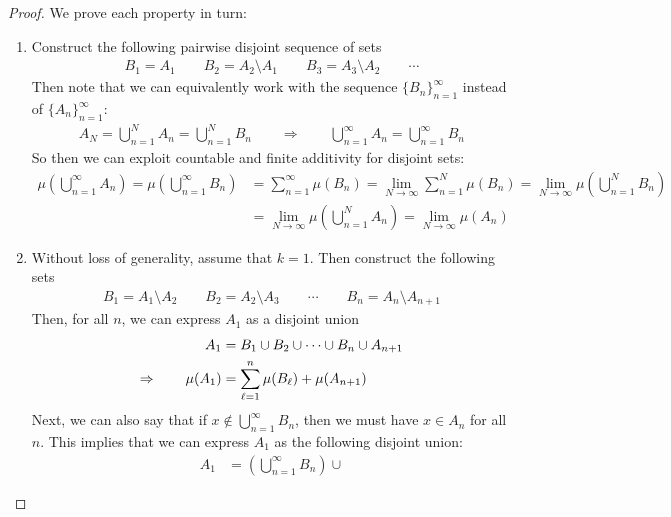 \documentclass[12pt]{article}
\theoremstyle{plain}
\theoremstyle{definition}
\theoremstyle{remark}
\newcommand{\ninf}{_{n=1}^\infty}
\begin{document}
\begin{proof}
We prove each property in turn:
\begin{enumerate}
  \item
    Construct the following pairwise disjoint sequence of sets
    \begin{align*}
        B_1 = A_1 \qquad B_2 = A_2 \setminus A_1
        \qquad B_3 = A_3 \setminus A_2 \qquad \cdots
    \end{align*}
    Then note that we can equivalently work with the sequence
    $\{B_n\}\ninf$ instead of $\{A_n\}\ninf$:
    \begin{align*}
        A_N = \bigcup^N_{n=1} A_n =
        \bigcup^N_{n=1} B_n
        \qquad \Rightarrow \qquad
        \bigcup^\infty_{n=1} A_n =
        \bigcup^\infty_{n=1} B_n
    \end{align*}
    So then we can exploit countable and finite additivity for disjoint
    sets:
    \begin{align*}
        \mu\left(\bigcup^\infty_{n=1} A_n \right)
        = \mu\left(\bigcup^\infty_{n=1} B_n \right)
        &= \sum^\infty_{n=1} \mu(B_n)
            = \lim_{N\rightarrow\infty}\sum^N_{n=1} \mu(B_n)
        = \lim_{N\rightarrow\infty}
            \mu\left(\bigcup^N_{n=1} B_n\right) \\
        &= \lim_{N\rightarrow\infty}
            \mu\left(\bigcup^N_{n=1} A_n\right)
        = \lim_{N\rightarrow\infty}
            \mu\left(A_n\right)
    \end{align*}
  \item
    Without loss of generality, assume that $k=1$. Then construct the
    following sets
    \begin{align*}
      B_1 = A_1 \setminus A_2 \qquad
      B_2 = A_2 \setminus A_3 \qquad
      \cdots\qquad
      B_n = A_n \setminus A_{n+1}
    \end{align*}
    Then, for all $n$, we can express $A_1$ as a disjoint union
    \begin{align}
        A_1 &= B_1 \cup B_2 \cup \cdots \cup B_n
        \cup A_{n+1} \notag\\
        \Rightarrow \qquad
        \mu(A_1) &= \sum^n_{\ell=1} \mu(B_\ell) +
        \mu(A_{n+1}) \label{prop.6.1}
    \end{align}
    Next, we can also say that if $x\not\in \bigcup^\infty_{n=1} B_n$,
    then we must have $x\in A_n$ for all $n$. This implies that we can
    express $A_1$ as the following disjoint union:
    \begin{align}
        A_1 &= \left(\bigcup^\infty_{n=1} B_n \right)\cup

\end{align}
\end{enumerate}
\end{proof}
\end{document}
